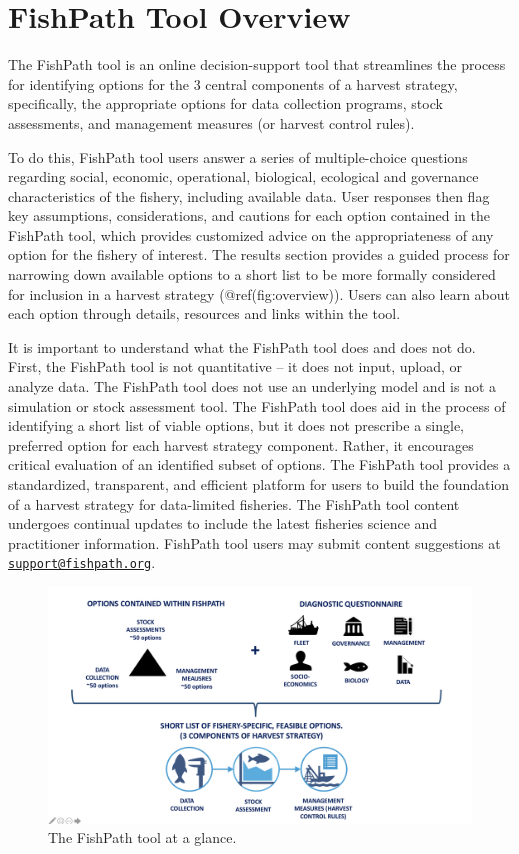 \documentclass[11pt,]{book}
\begin{document}
\hypertarget{fishpath-tool-overview}{%
\section{FishPath Tool Overview}\label{fishpath-tool-overview}}

The FishPath tool is an online decision-support tool that streamlines
the process for identifying options for the 3 central components of a
harvest strategy, specifically, the appropriate options for data
collection programs, stock assessments, and management measures (or
harvest control rules).

To do this, FishPath tool users answer a series of multiple-choice
questions regarding social, economic, operational, biological,
ecological and governance characteristics of the fishery, including
available data. User responses then flag key assumptions,
considerations, and cautions for each option contained in the FishPath
tool, which provides customized advice on the appropriateness of any
option for the fishery of interest. The results section provides a
guided process for narrowing down available options to a short list to
be more formally considered for inclusion in a harvest strategy
(@ref(fig:overview)). Users can also learn about each option through
details, resources and links within the tool.

It is important to understand what the FishPath tool does and does not
do. First, the FishPath tool is not quantitative -- it does not input,
upload, or analyze data. The FishPath tool does not use an underlying
model and is not a simulation or stock assessment tool. The FishPath
tool does aid in the process of identifying a short list of viable
options, but it does not prescribe a single, preferred option for each
harvest strategy component. Rather, it encourages critical evaluation of
an identified subset of options. The FishPath tool provides a
standardized, transparent, and efficient platform for users to build the
foundation of a harvest strategy for data-limited fisheries. The
FishPath tool content undergoes continual updates to include the latest
fisheries science and practitioner information. FishPath tool users may
submit content suggestions at
\href{mailto:support@fishpath.org}{\nolinkurl{support@fishpath.org}}.

\begin{figure}

{\centering \includegraphics[width=0.75\linewidth]{images/fishpath-tool-overview-diagram} 

}

\caption{The FishPath tool at a glance.}\label{fig:overview}
\end{figure}
\end{document}
